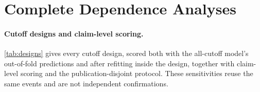 \documentclass[11pt]{article}
\begin{document}
\begin{table}[!t]\centering\scriptsize
\setlength{\tabcolsep}{3pt}
\caption{Semantic-orientation sensitivity: the benchmark with every claim flagged by the deterministic orientation rules removed (core: deficiency, therapeutic or preventive, restriction or inversion, non-disease outcome term; strict: core plus benefit-valence outcomes), models refitted leave-one-claim-out inside the retained claims.}
\label{tab:astra4}
\end{table}

\section{Complete Dependence Analyses}
\label{app:dependence}

\paragraph{Cutoff designs and claim-level scoring.} \cref{tab:designs} gives every cutoff
design, scored both with the all-cutoff model's out-of-fold predictions and after refitting inside
the design, together with claim-level scoring and the publication-disjoint protocol. These
sensitivities reuse the same events and are not independent confirmations.
\end{document}
